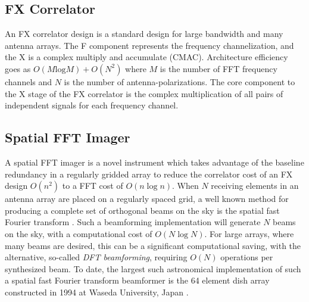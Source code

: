 \documentclass[useAMS,macros,usenatbib]{mn2e}
\begin{document}
\subsection{FX Correlator}
\label{correlator}
An FX correlator design is a standard design for large bandwidth and many antenna arrays.
The F component represents the frequency channelization, and the X is a complex multiply and accumulate (CMAC).
Architecture efficiency goes as $O( M \textrm{log} M) + O( N^2)$ where $M$ is the number of FFT frequency channels and $N$ is the number of antenna-polarizations.
The core component to the X stage of the FX correlator is the complex multiplication of all pairs of independent signals for each frequency channel.

\subsection{Spatial FFT Imager}
\label{sfft}
A spatial FFT imager is a novel instrument which takes advantage of the baseline redundancy in a regularly gridded array to reduce the correlator cost of an FX design $O(n^2)$ to a FFT cost of $O(n \log{n})$.
When $N$ receiving elements in an antenna array are placed on a regularly spaced grid, a well known method for producing a complete set of orthogonal beams on the sky is the spatial fast Fourier transform \citep{fastbeamforming}.
Such a beamforming implementation will generate $N$ beams on the sky, with a computational cost of $O(N\log{N})$. For large arrays, where many beams are desired, this can be a significant computational saving, with the alternative, so-called \emph{DFT beamforming}, requiring $O(N)$ operations per synthesized beam.
To date, the largest such astronomical implementation of such a spatial fast Fourier transform beamformer is the 64 element dish array constructed in 1994 at Waseda University, Japan \citep{2dfft}.
\end{document}
